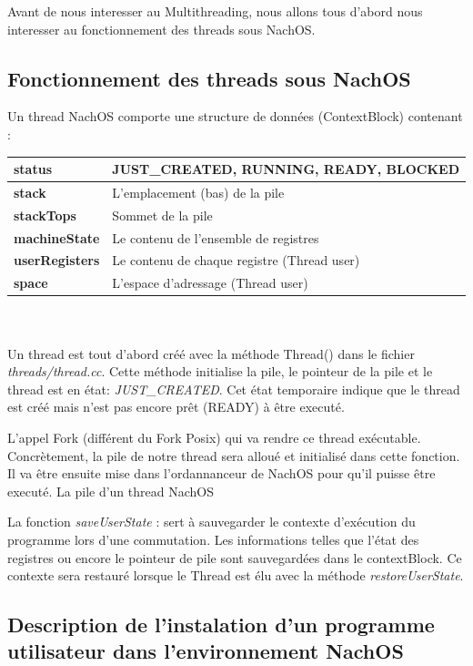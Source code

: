 \documentclass[a4paper,10pt]{article}
\begin{document}
Avant de nous interesser au Multithreading, nous allons tous d'abord nous
interesser au fonctionnement des threads sous NachOS.

\subsection{Fonctionnement des threads sous NachOS}

Un thread NachOS comporte une structure de données (ContextBlock) contenant :  
\vspace{0.3cm} \\
\begin{tabular}{|l|l|}
\hline 
 \textbf{status} & JUST\_CREATED, RUNNING, READY, BLOCKED \\ \hline 
 \textbf{stack}& L'emplacement (bas) de la pile \\ \hline
 \textbf{stackTops}& Sommet de la pile \\ \hline
 \textbf{machineState}&Le contenu de l'ensemble de registres \\ \hline
 \textbf{userRegisters} &Le contenu de chaque registre (Thread user) \\ \hline
 \textbf{space}& L'espace d'adressage (Thread user) \\ \hline
\end{tabular} \\
\vspace{0.2cm} \\

Un thread est tout d'abord créé avec la méthode Thread() dans le fichier 
\textit{threads/thread.cc}. Cette méthode initialise la pile, le pointeur de la 
pile et le thread est en état: \textit{JUST\_CREATED}. Cet état temporaire indique
que le thread est créé mais n'est pas encore prêt (READY) à être executé. 

L'appel Fork (différent du Fork Posix) qui va rendre ce
thread exécutable. Concrètement, la pile de notre thread sera alloué et 
initialisé dans cette fonction. Il va être ensuite mise dans l'ordannanceur de NachOS
pour qu'il puisse être executé. La pile d'un thread NachOS

La fonction \textit{saveUserState} : sert à sauvegarder le contexte d'exécution
du programme lors d'une commutation. Les informations telles que l'état des
registres ou encore le pointeur de pile sont sauvegardées dans le contextBlock.
Ce contexte sera restauré lorsque le Thread est élu avec la méthode
\textit{restoreUserState}.

\subsection{Description de l'instalation d'un programme utilisateur dans
l'environnement NachOS}
\end{document}
